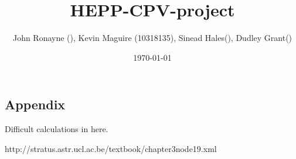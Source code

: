 \documentclass[twocolumn,floatfix,aps,prd,amsmath,amssymb]{revtex4}
\begin{document}
\title{HEPP-CPV-project}
\author{John Ronayne (), Kevin Maguire (10318135), Sinead Hales(), Dudley Grant()}
\date{\today}

\begin{abstract}
\textit{}
\end{abstract}

\maketitle
{}
 






\begin{appendix}
\section{Appendix}
Difficult calculations in here.
\end{appendix}
 
\begin{thebibliography}{10}
http://stratus.astr.ucl.ac.be/textbook/chapter3\textunderscore node19.xml

\end{thebibliography}
\end{document}
